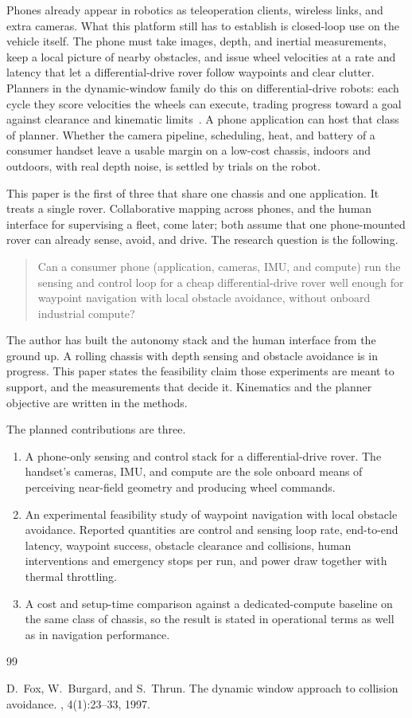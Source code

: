 \documentclass[11pt,a4paper]{article}
\begin{document}
Phones already appear in robotics as teleoperation clients, wireless links, and extra cameras.
What this platform still has to establish is closed-loop use on the vehicle itself.
The phone must take images, depth, and inertial measurements, keep a local picture of nearby obstacles, and issue wheel velocities at a rate and latency that let a differential-drive rover follow waypoints and clear clutter.
Planners in the dynamic-window family do this on differential-drive robots: each cycle they score velocities the wheels can execute, trading progress toward a goal against clearance and kinematic limits~\citep{fox1997dwa}.
A phone application can host that class of planner.
Whether the camera pipeline, scheduling, heat, and battery of a consumer handset leave a usable margin on a low-cost chassis, indoors and outdoors, with real depth noise, is settled by trials on the robot.

This paper is the first of three that share one chassis and one application.
It treats a single rover.
Collaborative mapping across phones, and the human interface for supervising a fleet, come later; both assume that one phone-mounted rover can already sense, avoid, and drive.
The research question is the following.

\begin{quote}
Can a consumer phone (application, cameras, IMU, and compute) run the sensing and control loop for a cheap differential-drive rover well enough for waypoint navigation with local obstacle avoidance, without onboard industrial compute?
\end{quote}

The author has built the autonomy stack and the human interface from the ground up.
A rolling chassis with depth sensing and obstacle avoidance is in progress.
This paper states the feasibility claim those experiments are meant to support, and the measurements that decide it.
Kinematics and the planner objective are written in the methods.

The planned contributions are three.

\begin{enumerate}
\item A phone-only sensing and control stack for a differential-drive rover.
  The handset's cameras, IMU, and compute are the sole onboard means of perceiving near-field geometry and producing wheel commands.
\item An experimental feasibility study of waypoint navigation with local obstacle avoidance.
  Reported quantities are control and sensing loop rate, end-to-end latency, waypoint success, obstacle clearance and collisions, human interventions and emergency stops per run, and power draw together with thermal throttling.
\item A cost and setup-time comparison against a dedicated-compute baseline on the same class of chassis, so the result is stated in operational terms as well as in navigation performance.
\end{enumerate}


\begin{thebibliography}{99}

D.~Fox, W.~Burgard, and S.~Thrun.
\newblock The dynamic window approach to collision avoidance.
, 4(1):23--33, 1997.

\end{thebibliography}
\end{document}
